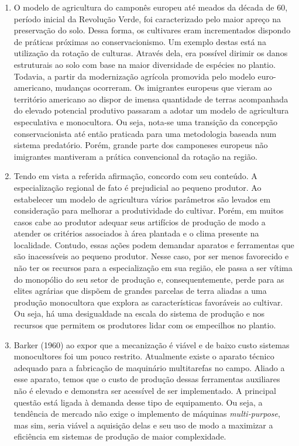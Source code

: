 \documentclass[a4paper, 12pt]{article}
\begin{document}
	\begin{enumerate}
		\item O modelo de agricultura do camponês europeu até meados da década de 60, período inicial da Revolução Verde, foi caracterizado pelo maior apreço na preservação do solo. Dessa forma, os cultivares eram incrementados dispondo de práticas próximas ao conservacionismo. Um exemplo destas está na utilização da rotação de culturas. Através dela, era possível dirimir os danos estruturais ao solo com base na maior diversidade de espécies no plantio. Todavia, a partir da modernização agrícola promovida pelo modelo euro-americano, mudanças ocorreram. Os imigrantes europeus que vieram ao território americano ao dispor de imensa quantidade de terras acompanhada do elevado potencial  produtivo passaram a adotar um modelo de agricultura especulativa e monocultora. Ou seja, nota-se uma transição da concepção conservacionista até então praticada para uma metodologia baseada num sistema predatório. Porém, grande parte dos camponeses europeus não imigrantes mantiveram a prática convencional da rotação na região.
		
		\item Tendo em vista a referida afirmação, concordo com seu conteúdo. A especialização regional de fato é prejudicial ao pequeno produtor. Ao estabelecer um modelo de agricultura vários parâmetros são levados em consideração para melhorar a produtividade do cultivar. Porém, em muitos casos cabe ao produtor adequar seus artifícios de produção de modo a atender os critérios associados à área plantada e o clima presente na localidade. Contudo, essas ações podem demandar aparatos e ferramentas que são inacessíveis ao pequeno produtor. Nesse caso, por ser menos favorecido e não ter os recursos para a especialização em sua região, ele passa a ser vítima do monopólio do seu setor de produção e, consequentemente, perde para as elites agrárias que dispõem de grandes parcelas de terra aliadas a uma produção monocultora que explora as características favoráveis ao cultivar. Ou seja, há uma desigualdade na escala do sistema de produção e nos recursos que permitem os produtores lidar com os empecilhos no plantio.
		
		\item Barker (1960) ao expor que a mecanização é viável e de baixo custo sistemas monocultores foi um pouco restrito. Atualmente existe o aparato técnico adequado para a fabricação de maquinário multitarefas no campo. Aliado a esse aparato, temos que o custo de produção dessas ferramentas auxiliares não é elevado e demonstra ser acessível de ser implementado. A principal questão está ligada à demanda desse tipo de equipamento. Ou seja, a tendência de mercado não exige o implemento de máquinas \textit{multi-purpose}, mas sim, seria viável a aquisição delas e seu uso de modo a maximizar a eficiência em sistemas de produção de maior complexidade.
	\end{enumerate}
\end{document}
